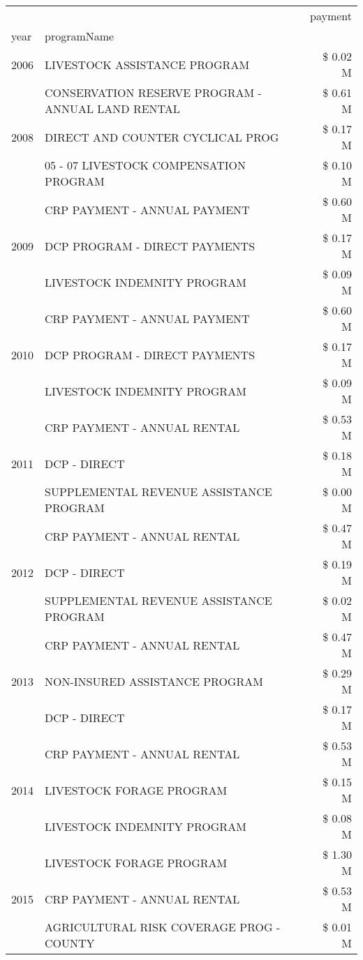 \begin{tabular}{llr}
\toprule
 &  & payment \\
year & programName &  \\
\midrule
2006 & LIVESTOCK ASSISTANCE PROGRAM & \$ 0.02 M \\
\cline{1-3}
\multirow[t]{3}{*}{2008} & CONSERVATION RESERVE PROGRAM - ANNUAL LAND RENTAL & \$ 0.61 M \\
 & DIRECT AND COUNTER CYCLICAL PROG & \$ 0.17 M \\
 & 05 - 07 LIVESTOCK COMPENSATION PROGRAM & \$ 0.10 M \\
\cline{1-3}
\multirow[t]{3}{*}{2009} & CRP PAYMENT - ANNUAL PAYMENT & \$ 0.60 M \\
 & DCP PROGRAM - DIRECT PAYMENTS & \$ 0.17 M \\
 & LIVESTOCK INDEMNITY PROGRAM & \$ 0.09 M \\
\cline{1-3}
\multirow[t]{3}{*}{2010} & CRP PAYMENT - ANNUAL PAYMENT & \$ 0.60 M \\
 & DCP PROGRAM - DIRECT PAYMENTS & \$ 0.17 M \\
 & LIVESTOCK INDEMNITY PROGRAM & \$ 0.09 M \\
\cline{1-3}
\multirow[t]{3}{*}{2011} & CRP PAYMENT - ANNUAL RENTAL & \$ 0.53 M \\
 & DCP - DIRECT & \$ 0.18 M \\
 & SUPPLEMENTAL REVENUE ASSISTANCE PROGRAM & \$ 0.00 M \\
\cline{1-3}
\multirow[t]{3}{*}{2012} & CRP PAYMENT - ANNUAL RENTAL & \$ 0.47 M \\
 & DCP - DIRECT & \$ 0.19 M \\
 & SUPPLEMENTAL REVENUE ASSISTANCE PROGRAM & \$ 0.02 M \\
\cline{1-3}
\multirow[t]{3}{*}{2013} & CRP PAYMENT - ANNUAL RENTAL & \$ 0.47 M \\
 & NON-INSURED ASSISTANCE PROGRAM & \$ 0.29 M \\
 & DCP - DIRECT & \$ 0.17 M \\
\cline{1-3}
\multirow[t]{3}{*}{2014} & CRP PAYMENT - ANNUAL RENTAL & \$ 0.53 M \\
 & LIVESTOCK FORAGE PROGRAM & \$ 0.15 M \\
 & LIVESTOCK INDEMNITY PROGRAM & \$ 0.08 M \\
\cline{1-3}
\multirow[t]{3}{*}{2015} & LIVESTOCK FORAGE PROGRAM & \$ 1.30 M \\
 & CRP PAYMENT - ANNUAL RENTAL & \$ 0.53 M \\
 & AGRICULTURAL RISK COVERAGE PROG - COUNTY & \$ 0.01 M \\

\end{tabular}
